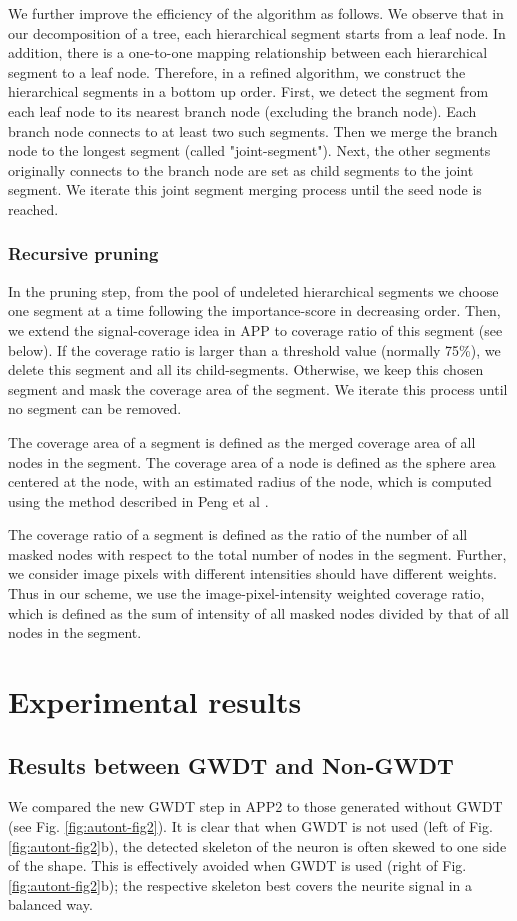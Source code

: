 We further improve the efficiency of the algorithm as follows. We observe that in our decomposition of a tree, each hierarchical segment starts from a leaf node. In addition, there is a one-to-one mapping relationship between each hierarchical segment to a leaf node. Therefore, in a refined algorithm, we construct the hierarchical segments in a bottom up order. First, we detect the segment from each leaf node to its nearest branch node (excluding the branch node). Each branch node connects to at least two such segments. Then we merge the branch node to the longest segment (called "joint-segment"). Next, the other segments originally connects to the branch node are set as child segments to the joint segment. We iterate this joint segment merging process until the seed node is reached. 
\subsubsection{Recursive pruning}
In the pruning step, from the pool of undeleted hierarchical segments we choose one segment at a time following the importance-score in decreasing order. Then, we extend the signal-coverage idea in APP to coverage ratio of this segment (see below). If the coverage ratio is larger than a threshold value (normally 75\%), we delete this segment and all its child-segments. Otherwise, we keep this chosen segment and mask the coverage area of the segment. We iterate this process until no segment can be removed.

The coverage area of a segment is defined as the merged coverage area of all nodes in the segment. The coverage area of a node is defined as the sphere area centered at the node, with an estimated radius of the node, which is computed using the method described in Peng et al \cite{peng2010v3d,peng2010automatic}.

The coverage ratio of a segment is defined as the ratio of the number of all masked nodes with respect to the total number of nodes in the segment. Further, we consider image pixels with different intensities should have different weights. Thus in our scheme, we use the image-pixel-intensity weighted coverage ratio, which is defined as the sum of intensity of all masked nodes divided by that of all nodes in the segment.
\section{Experimental results}
\subsection{Results between GWDT and Non-GWDT}
We compared the new GWDT step in APP2 to those generated without GWDT (see Fig. \ref{fig:autont-fig2}). It is clear that when GWDT is not used (left of Fig. \ref{fig:autont-fig2}b), the detected skeleton of the neuron is often skewed to one side of the shape. This is effectively avoided when GWDT is used (right of Fig. \ref{fig:autont-fig2}b); the respective skeleton best covers the neurite signal in a balanced way.

